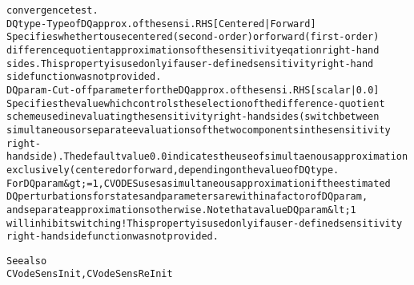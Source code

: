 \begin{alltt}
   convergence test.
DQtype - Type of DQ approx. of the sensi. RHS [{Centered} | Forward ]
   Specifies whether to use centered (second-order) or forward (first-order)
   difference quotient approximations of the sensitivity eqation right-hand
   sides. This property is used only if a user-defined sensitivity right-hand
   side function was not provided.
DQparam - Cut-off parameter for the DQ approx. of the sensi. RHS [ scalar | {0.0} ]
   Specifies the value which controls the selection of the difference-quotient
   scheme used in evaluating the sensitivity right-hand sides (switch between
   simultaneous or separate evaluations of the two components in the sensitivity
   right-hand side). The default value 0.0 indicates the use of simultaenous approximation
   exclusively (centered or forward, depending on the value of DQtype.
   For DQparam &gt;= 1, CVODES uses a simultaneous approximation if the estimated
   DQ perturbations for states and parameters are within a factor of DQparam,
   and separate approximations otherwise. Note that a value DQparam &lt; 1
   will inhibit switching! This property is used only if a user-defined sensitivity
   right-hand side function was not provided.

   See also
        CVodeSensInit, CVodeSensReInit
\end{alltt}






\vspace{0.1in}